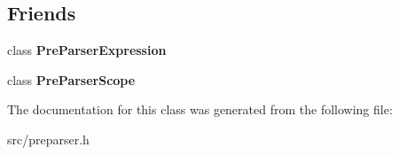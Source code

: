 \subsection*{Friends}
\begin{DoxyCompactItemize}
\item 
\hypertarget{classv8_1_1internal_1_1_pre_parser_identifier_abadb8c3c970501a35d2b45b9512eba94}{}class {\bfseries Pre\+Parser\+Expression}\label{classv8_1_1internal_1_1_pre_parser_identifier_abadb8c3c970501a35d2b45b9512eba94}

\item 
\hypertarget{classv8_1_1internal_1_1_pre_parser_identifier_a5135891d6e1e2b11aeb600d3f27685fa}{}class {\bfseries Pre\+Parser\+Scope}\label{classv8_1_1internal_1_1_pre_parser_identifier_a5135891d6e1e2b11aeb600d3f27685fa}

\end{DoxyCompactItemize}


The documentation for this class was generated from the following file\+:\begin{DoxyCompactItemize}
\item 
src/preparser.\+h\end{DoxyCompactItemize}
